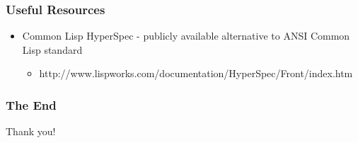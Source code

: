 \documentclass{beamer}
\begin{document}

\begin{frame}
  \frametitle{Useful Resources}
  \begin{itemize}
  \item Common Lisp HyperSpec - publicly available alternative to ANSI Common
    Lisp standard
    \begin{itemize}
    \item \scriptsize{http://www.lispworks.com/documentation/HyperSpec/Front/index.htm}
    \end{itemize}
  \end{itemize}
\end{frame}

\begin{frame}
  \frametitle{The End}
  \begin{center}
    Thank you!
  \end{center}
\end{frame}
\end{document}
